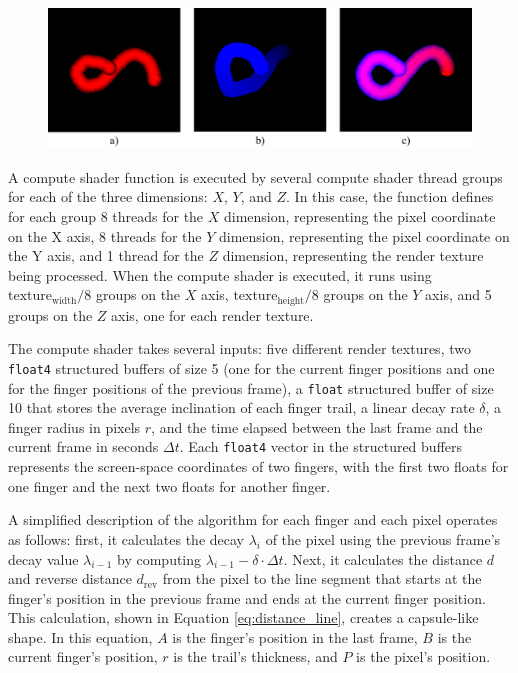         \begin{figure}[h!]
            \centering
            \includegraphics[width=1\textwidth]{figures/touch_progress.png}
            \label{fig:touch_progress}
        \end{figure}

        A compute shader function is executed by several compute shader thread groups for each of the three dimensions: \(X\), \(Y\), and \(Z\). In this case, the function defines for each group 8 threads for the \(X\) dimension, representing the pixel coordinate on the X axis, 8 threads for the \(Y\) dimension, representing the pixel coordinate on the Y axis, and 1 thread for the \(Z\) dimension, representing the render texture being processed. When the compute shader is executed, it runs using \(\text{texture}_{\text{width}} / 8\) groups on the \(X\) axis, \(\text{texture}_{\text{height}} / 8\) groups on the \(Y\) axis, and 5 groups on the \(Z\) axis, one for each render texture.

        The compute shader takes several inputs: five different render textures, two \lstinline{float4} structured buffers of size 5 (one for the current finger positions and one for the finger positions of the previous frame), a \lstinline{float} structured buffer of size 10 that stores the average inclination of each finger trail, a linear decay rate $\delta$, a finger radius in pixels $r$, and the time elapsed between the last frame and the current frame in seconds $\Delta t$. Each \lstinline{float4} vector in the structured buffers represents the screen-space coordinates of two fingers, with the first two floats for one finger and the next two floats for another finger.

        A simplified description of the algorithm for each finger and each pixel operates as follows: first, it calculates the decay \(\lambda_i\) of the pixel using the previous frame's decay value \(\lambda_{i-1}\) by computing \(\lambda_{i-1} - \delta \cdot \Delta t\). Next, it calculates the distance \(d\) and reverse distance $d_{\mathrm{rev}}$ from the pixel to the line segment that starts at the finger's position in the previous frame and ends at the current finger position. This calculation, shown in Equation \ref{eq:distance_line}, creates a capsule-like shape. In this equation, \(A\) is the finger's position in the last frame, \(B\) is the current finger's position, \(r\) is the trail's thickness, and \(P\) is the pixel's position.

